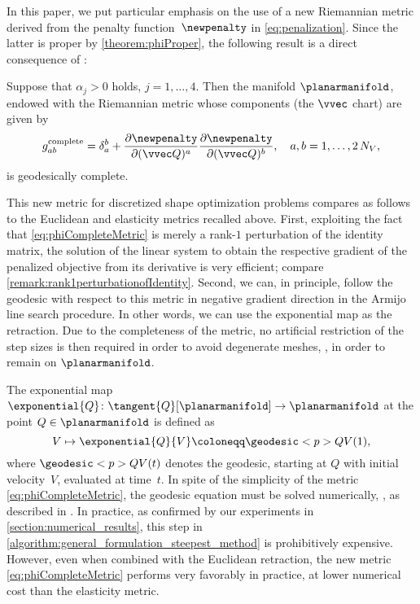 In this paper, we put particular emphasis on the use of a new Riemannian metric derived from the penalty function~$\newpenalty$ in \eqref{eq:penalization}.
Since the latter is proper by \cref{theorem:phiProper}, the following result is a direct consequence of \cite[Theorem~1]{Gordon:1973:1}:
\begin{proposition}
	\label{proposition:NewCompleteMetric}
	Suppose that $\alpha_j > 0$ holds, $j = 1,\ldots,4$.
	Then the manifold $\planarmanifold$, endowed with the Riemannian metric whose components (\wrt the $\vvec$ chart) are given by
	\begin{equation}
		\label{eq:phiCompleteMetric}
		g_{ab}^\textup{complete}
		=
		\delta^b_a + \frac{\partial \newpenalty}{\partial (\vvec Q)^a}\frac{\partial \newpenalty}{\partial (\vvec Q)^b}
		,
		\quad
		a, b = 1, \ldots, 2 \, N_V
		,
	\end{equation}
	is geodesically complete.
\end{proposition}
This new metric for discretized shape optimization problems compares as follows to the Euclidean and elasticity metrics recalled above.
First, exploiting the fact that \eqref{eq:phiCompleteMetric} is merely a rank-$1$ perturbation of the identity matrix, the solution of the linear system to obtain the respective gradient of the penalized objective from its derivative is very efficient; compare \cref{remark:rank1perturbationofIdentity}.
Second, we can, in principle, follow the geodesic with respect to this metric in negative gradient direction in the Armijo line search procedure.
In other words, we can use the exponential map as the retraction.
Due to the completeness of the metric, no artificial restriction of the step sizes is then required in order to avoid degenerate meshes, \ie, in order to remain on $\planarmanifold$.

The exponential map $\exponential{Q} \colon \tangent{Q}[\planarmanifold] \to \planarmanifold$ at the point $Q \in \planarmanifold$ is defined as
\begin{equation}
	\label{eq:exponential_map}
	V
	\mapsto
	\exponential{Q}{V}
	\coloneqq
	\geodesic<p>{Q}{V}(1)
	,
\end{equation}
where $\geodesic<p>{Q}{V}(t)$ denotes the geodesic, starting at $Q$ with initial velocity~$V$, evaluated at time~$t$.
In spite of the simplicity of the metric \eqref{eq:phiCompleteMetric}, the geodesic equation must be solved numerically, \eg, as described in \cite[Section~5]{HerzogLoayzaRomero:2022:1}.
In practice, as confirmed by our experiments in \cref{section:numerical_results}, this step in \cref{algorithm:general_formulation_steepest_method} is prohibitively expensive.
However, even when combined with the Euclidean retraction, the new metric \eqref{eq:phiCompleteMetric} performs very favorably in practice, at lower numerical cost than the elasticity metric.


